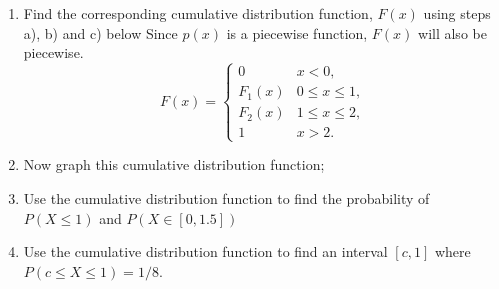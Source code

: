 \documentclass[10pt]{article}
\begin{document}
\begin{enumerate}
    \item  Find the corresponding cumulative distribution function, $F(x)$ using steps a), b) and c) below Since $p(x)$ is a piecewise function, $F(x)$ will also be piecewise.
   \[
F(x) =
\begin{cases}
0 & x < 0, \\[6pt]
F_1(x) & 0 \le x \le 1, \\[6pt]
F_2(x) & 1 \le x \le 2, \\[6pt]
1 & x > 2.
\end{cases} 
     \]
    \item Now graph this cumulative distribution function;
    \vspace{2cm}
    \item Use the cumulative distribution function to find the probability of $P(X \leq 1)$ and $P(X \in [0,1.5])$
    \vspace{2cm}
    \item  Use the cumulative distribution function to find an interval $[c,1]$ where $P(c\leq X\leq 1)=1/8$.
\end{enumerate}
\end{document}
